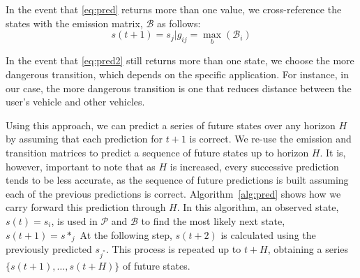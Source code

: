 \documentclass[letterpaper, 10 pt, conference]{ieeeconf}  %
\newcommand\NB[1]{$\spadesuit$\footnote{NB: #1}}
\begin{document}
In the event that \eqref{eq:pred} returns more than one value, we cross-reference the states with the emission matrix, $\mathcal{B}$ as follows: 
\begin{equation} \label{eq:pred2}
    s(t+1)=s_j\vert g_{ij} = \max_b(\mathcal{B}_i)    
\end{equation}


In the event that \eqref{eq:pred2} still returns more than one state, we choose the more dangerous transition, which depends on the specific application. For instance, in our case, the more dangerous transition is one that reduces distance between the user's vehicle and other vehicles.

Using this approach, we can predict a series of future states over any horizon $H$ by assuming that each prediction for $t+1$ is correct. We re-use the emission and transition matrices to predict a sequence of future states up to horizon $H$.
It is, however, important to note that as $H$ is increased, every successive prediction tends to be less accurate, as the sequence of future predictions is built assuming each of the previous predictions is correct.
Algorithm~\ref{alg:pred} shows how we carry forward this prediction through $H$. In this algorithm, an observed state, $s(t) = s_i$, is used in %
$\mathcal P$ and $\mathcal B$ to find the most likely next state, $s(t+1) = s*_{j}$ %
At the following step, $s(t+2)$ is calculated using the previously predicted $s_{j^*}$. This process is repeated up to $t+H$, obtaining a series $\{s(t+1),\ldots,s(t+H)\}$ of future states.
\end{document}
